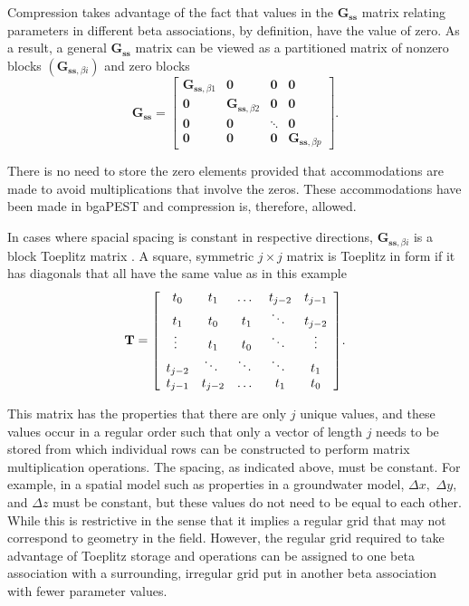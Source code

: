 \documentclass[11pt,oneside,onecolumn]{usgsreport}
\begin{document}
\begin{appendix}
Compression takes advantage of the fact that values in the $\mathbf{G_{ss}}$
matrix relating parameters in different beta associations, by definition,
have the value of zero. As a result, a general $\mathbf{G_{ss}}$
matrix can be viewed as a partitioned matrix of nonzero blocks $\left(\mathbf{G}_{\mathbf{ss},\beta i}\right)$
and zero blocks
\[
\mathbf{G}_{\mathbf{ss}}=\left[\begin{array}{cccc}
\mathbf{G}_{\mathbf{ss},\beta1} & \mathbf{0} & \mathbf{0} & \mathbf{0}\\
\mathbf{0} & \mathbf{G}_{\mathbf{ss},\beta2} & \mathbf{0} & \mathbf{0}\\
\mathbf{0} & \mathbf{0} & \ddots & \mathbf{0}\\
\mathbf{0} & \mathbf{0} & \mathbf{0} & \mathbf{G}_{\mathbf{ss},\beta p}
\end{array}\right].
\]


There is no need to store the zero elements provided that accommodations
are made to avoid multiplications that involve the zeros. These accommodations
have been made in bgaPEST and compression is, therefore, allowed.

In cases where spacial spacing is constant in respective directions,
$\mathbf{G}_{\mathbf{ss},\beta i}$ is a block Toeplitz matrix \citep{toeplitz}.
A square, symmetric $j\times j$ matrix is Toeplitz in form if it
has diagonals that all have the same value as in this example
\[
\mathbf{T}=\text{\ensuremath{\left[\begin{array}{ccccc}
 t_{0}  &  t_{1}  &  \dots\  &  t_{j-2}  &  t_{j-1}\\
t_{1}  &  t_{0}  &  t_{1}  &  \ddots\  &  t_{j-2}\\
\vdots\  &  t_{1}  &  t_{0}  &  \ddots\  &  \vdots\\
t_{j-2}  &  \ddots\  &  \ddots\  &  \ddots\  &  t_{1}\\
t_{j-1}  &  t_{j-2}  &  \dots\  &  t_{1}  &  t_{0} 
\end{array}\right]}}.
\]


This matrix has the properties that there are only $j$ unique values,
and these values occur in a regular order such that only a vector
of length $j$ needs to be stored from which individual rows can be
constructed to perform matrix multiplication operations. The spacing,
as indicated above, must be constant. For example, in a spatial model
such as properties in a groundwater model, $\Delta x,$ $\Delta y,$
and $\Delta z$ must be constant, but these values do not need to
be equal to each other. While this is restrictive in the sense that
it implies a regular grid that may not correspond to geometry in the
field. However, the regular grid required to take advantage of Toeplitz
storage and operations can be assigned to one beta association with
a surrounding, irregular grid put in another beta association with
fewer parameter values.


\end{appendix}
\end{document}
